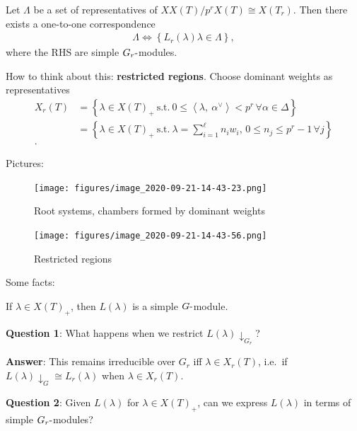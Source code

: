 \begin{theorem}

\begin{theorem}

Let \(\Lambda\) be a set of representatives of
\(XX(T) / p^r X(T) \cong X(T_r)\). Then there exists a one-to-one
correspondence
\begin{align*}   \Lambda \iff \left\{{L_r(\lambda) \lambda \in \Lambda}\right\} ,\end{align*}
where the RHS are simple \(G_r{\hbox{-}}\)modules.

\end{theorem}

\end{theorem}

How to think about this: \textbf{restricted regions}. Choose dominant
weights as representatives
\begin{align*}   X_r(T)  &= \left\{{\lambda \in X(T)_+ ~{\text{s.t.}}~0\leq {\left\langle {\lambda},~{\alpha^\vee} \right\rangle} < p^r\, \forall \alpha\in \Delta }\right\} \\ &= \left\{{\lambda \in X(T)_+ ~{\text{s.t.}}~\lambda = \sum_{i=1}^\ell n_i w_i,\, 0\leq n_j \leq p^r-1\, \forall j}\right\} \\ .\end{align*}

Pictures:

\begin{figure}
\centering
\texttt{[image: figures/image\_2020-09-21-14-43-23.png]}
\caption{Root systems, chambers formed by dominant weights}
\end{figure}

\begin{figure}
\centering
\texttt{[image: figures/image\_2020-09-21-14-43-56.png]}
\caption{Restricted regions}
\end{figure}

Some facts:

If \(\lambda \in X(T)_+\), then \(L(\lambda)\) is a simple
\(G{\hbox{-}}\)module.

\textbf{Question 1}: What happens when we restrict
\(L(\lambda)\downarrow_{G_r}\)?

\textbf{Answer}: This remains irreducible over \(G_r\) iff
\(\lambda \in X_r(T)\), i.e.~if
\(L(\lambda)\downarrow_{G} \cong L_r(\lambda)\) when
\(\lambda \in X_r(T)\).

\textbf{Question 2}: Given \(L(\lambda)\) for \(\lambda \in X(T)_+\),
can we express \(L(\lambda)\) in terms of simple
\(G_r{\hbox{-}}\)modules?

